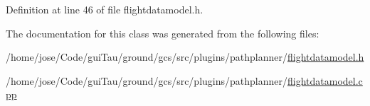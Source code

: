 Definition at line 46 of file flightdatamodel.\-h.



The documentation for this class was generated from the following files\-:\begin{DoxyCompactItemize}
\item 
/home/jose/\-Code/gui\-Tau/ground/gcs/src/plugins/pathplanner/\hyperlink{flightdatamodel_8h}{flightdatamodel.\-h}\item 
/home/jose/\-Code/gui\-Tau/ground/gcs/src/plugins/pathplanner/\hyperlink{flightdatamodel_8cpp}{flightdatamodel.\-cpp}\end{DoxyCompactItemize}
